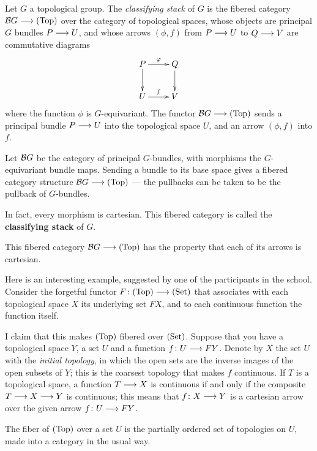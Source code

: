 \begin{3   FIBERED CATEGORIES}
\begin{3.2 Examples of fibered categories}
\begin{example}\label{ex:classifying} Let $G$ a topological group. The \emph{classifying stack}%
 of $G$ is the fibered category $\cB G \arr \cattop$ over the category of topological spaces, whose objects are principal $G$ bundles $P \arr U$, and whose arrows $(\phi, f)$ from $P \arr U$ to $Q \arr V$  are commutative diagrams
   \[
   \xymatrix{
   P\ar[r]^\phi\ar[d] & Q\ar[d]\\
   U\ar[r]^f & V
   }
   \]
where the function $\phi$ is $G$-equivariant. The functor $\cB G \arr \cattop$ sends a principal bundle $P \arr U$ into the topological space $U$,  and an arrow $(\phi, f)$ into $f$.
\begin{shaded}
Let $\mathcal{B} G$ be the category of principal $G$-bundles, with morphisms the $G$-equivariant bundle maps. Sending a bundle to its base space gives a fibered category structure $\mathcal{B} G\longrightarrow(\mathrm{Top})$ --- the pullbacks can be taken to be the pullback of $G$-bundles.

In fact, every morphism is cartesian. This fibered category is called the \textbf{classifying stack} of $G$.
\end{shaded}

This fibered category $\cB G \arr \cattop$ has the property that each of its arrows is cartesian.
\end{example}

\begin{example}
Here is an interesting example, suggested by one of the participants in the school. Consider the forgetful functor $F \colon \cattop \arr \catset$ that associates with each topological space $X$ its underlying set $FX$, and to each continuous function the function itself.

I claim that this makes $(\mathrm{Top})$ fibered over $(\mathrm{Set})$. Suppose that you have a topological space $Y$, a set $U$ and a function $f \colon U \arr FY$. Denote by $X$ the set $U$ with the \emph{initial topology}, in which the open sets are the inverse images of the open subsets of $Y$; this is the coarsest topology that makes $f$ continuous. If $T$ is a topological space, a function $T \arr X$ is continuous if and only if the composite $T \arr X \arr Y$ is continuous; this means that $f \colon X \arr Y$ is a cartesian arrow over the given arrow $f \colon U \arr FY$.

The fiber of $(\mathrm{Top})$ over a set $U$ is the partially ordered set of topologies on $U$, made into a category in the usual way.


\end{example}
\end{3.2 Examples of fibered categories}
\end{3   FIBERED CATEGORIES}
